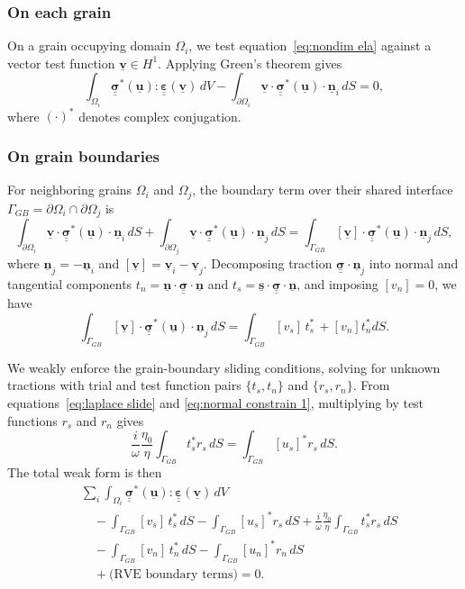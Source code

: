 \documentclass[12pt]{article}
\newcommand{\tensor}[1]{\underline{\underline{\boldsymbol{#1}}}}
\newcommand{\vect}[1]{\underline{\boldsymbol{#1}}}
\begin{document}
\subsubsection{On each grain}
On a grain occupying domain $\Omega_i$, we test equation~\ref{eq:nondim ela} against a vector test function $\vect{v} \in H^1$. Applying Green’s theorem gives
\begin{equation}
    \int_{\Omega_i} \tensor{\sigma}^*(\vect{u}) : \tensor{\varepsilon}(\vect{v})\, dV
    - \int_{\partial\Omega_i} \vect{v}\cdot\tensor{\sigma}^*(\vect{u})\cdot\vect{n}_i\, dS = 0, \label{eq: ingrain weak}
\end{equation}
where $(\cdot)^*$ denotes complex conjugation.

\subsubsection{On grain boundaries} \label{gb}
For neighboring grains $\Omega_i$ and $\Omega_j$, the boundary term over their shared interface $\Gamma_{GB} = \partial\Omega_i \cap \partial\Omega_j$ is
\begin{equation}
    \int_{\partial\Omega_i} \vect{v}\cdot\tensor{\sigma}^*(\vect{u})\cdot\vect{n}_i\, dS 
    + \int_{\partial\Omega_j} \vect{v}\cdot\tensor{\sigma}^*(\vect{u})\cdot\vect{n}_j\, dS
    = \int_{\Gamma_{GB}} [\vect{v}]\cdot\tensor{\sigma}^*(\vect{u})\cdot\vect{n}_j\, dS,
\end{equation}
where $\vect{n}_j = -\vect{n}_i$ and $[\vect{v}] = \vect{v}_i - \vect{v}_j$.
Decomposing traction $\tensor{\sigma}\cdot\vect{n}_j$ into normal and tangential components $t_n = \vect{n}\cdot\tensor{\sigma}\cdot\vect{n}$ and $t_s = \vect{s}\cdot\tensor{\sigma}\cdot\vect{n}$, and imposing $[v_n]=0$, we have
\begin{equation}
    \int_{\Gamma_{GB}} [\vect{v}]\cdot\tensor{\sigma}^*(\vect{u})\cdot\vect{n}_j\, dS = \int_{\Gamma_{GB}} [v_s]\, t_s^*\, +[v_n]t_n^*dS.
\end{equation}

We weakly enforce the grain-boundary sliding conditions, solving for unknown tractions with trial and test function pairs $\{t_s, t_n\}$ and $\{r_s, r_n\}$. From equations~\ref{eq:laplace slide} and \ref{eq:normal constrain 1}, multiplying by test functions $r_s$ and $r_n$ gives
\begin{equation}
    \frac{i}{\omega}\frac{\eta_0}{\eta}\int_{\Gamma_{GB}} t_s^* r_s\, dS = \int_{\Gamma_{GB}} [u_s]^* r_s\, dS.
\end{equation}
The total weak form is then
\begin{equation}
\begin{aligned}
&\sum_i \int_{\Omega_i} \tensor{\sigma}^*(\vect{u}) : \tensor{\varepsilon}(\vect{v})\, dV \\
&\quad - \int_{\Gamma_{GB}} [v_s]\, t_s^*\, dS 
-\int_{\Gamma_{GB}} [u_s]^* r_s\, dS 
+ \frac{i}{\omega}\frac{\eta_0}{\eta}\int_{\Gamma_{GB}}t_s^* r_s\, dS  \\
&\quad  - \int_{\Gamma_{GB}} [v_n]\, t_n^*\, dS 
-\int_{\Gamma_{GB}} [u_n]^* r_n\, dS \\
&\quad + \text{(RVE boundary terms)} = 0.
\end{aligned}
\end{equation}
\end{document}
